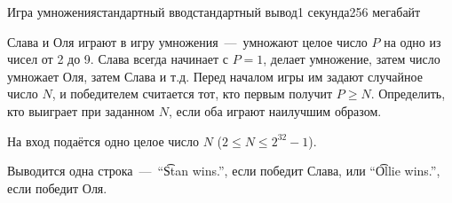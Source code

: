 \begin{problem}{Игра умножения}{стандартный ввод}{стандартный вывод}{1 секунда}{256 мегабайт}

Слава и Оля играют в игру умножения~---~умножают целое число $P$ на одно из чисел от 2 до 9. Слава всегда начинает с $P = 1$, делает умножение, затем число умножает Оля, затем Слава и т.д. Перед началом игры им задают случайное число $N$, и победителем считается тот, кто первым получит $P \ge N$. Определить, кто выиграет при заданном $N$, если оба играют наилучшим образом.

\InputFile
На вход подаётся одно целое число $N$ ($2 \le N \le 2^{32} - 1$).

\OutputFile
Выводится одна строка~---~``\t{Stan wins.}'', если победит Слава, или ``\t{Ollie wins.}'', если победит Оля.


\Examples

\begin{example}
%
%
%
\end{example}

\end{problem}

